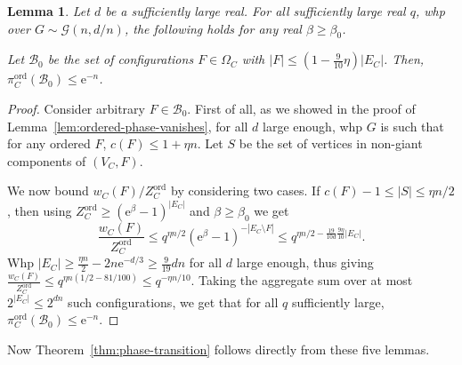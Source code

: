 \documentclass[11pt]{article}
\theoremstyle{plain}
\newtheorem{lemma}[theorem]{Lemma}
\newcommand{\G}{\mathcal{G}}
\newcommand{\emm}{\mathrm{e}}
\newcommand{\1}{\mathbb{1}}
\newcommand{\ord}{\mathrm{ord}}
\begin{document}
\begin{lemma}
    Let $d$ be a sufficiently large real. For all sufficiently large real $q$, whp over \(G\sim\G(n,d/n)\), the following holds for any real \(\beta\geq\beta_0\).

    Let $\mathcal{B}_0$ be the set of configurations $F\in \Omega_C$ with $|F|\leq (1-\tfrac{9}{10}\eta)|E_C|$.  Then, $\pi^{\ord}_C(\mathcal{B}_0)\leq \emm^{-n}$.
\end{lemma}
\begin{proof}
    Consider arbitrary \(F\in \mathcal{B}_0\). First of all, as we showed in the proof of Lemma~\ref{lem:ordered-phase-vanishes}, for all \(d\) large enough, whp \(G\) is such that for any ordered \(F\), \(c(F)\leq 1+\eta n\). Let \(S\) be the set of vertices in non-giant components of \((V_C,F)\).
    
    We now bound \(w_C(F)/Z_C^\ord\) by considering two cases.  If \(c(F) - 1\leq |S|\leq \eta n/2\), then using \(Z_C^\ord\geq (\emm^\beta-1)^{|E_C|}\) and \(\beta\geq\beta_0\) we get
    \[
    \frac{w_C(F)}{Z_C^\ord}\leq q^{\eta n / 2} (\emm^\beta-1)^{-|E_C\setminus F|}\leq q^{\eta n/2 - \frac{19}{10d}\frac{9\eta}{10}|E_C|}.
    \]
    Whp \(|E_C|\geq \frac{\eta n}{2}-2n\emm^{-d/3}\geq \frac{9}{19}dn\) for all \(d\) large enough, thus giving \(\frac{w_C(F)}{Z_C^\ord}\leq q^{\eta n(1 / 2 - 81/100)}\leq q^{-\eta n/10}\). Taking the aggregate sum over at most \(2^{|E_C|}\leq 2^{dn}\) such configurations, we get that for all \(q\) sufficiently large, \(\pi_C^\ord(\mathcal{B}_0)\leq \emm^{-n}\).
\end{proof}

Now Theorem~\ref{thm:phase-transition} follows directly from these five lemmas. 
\end{document}

